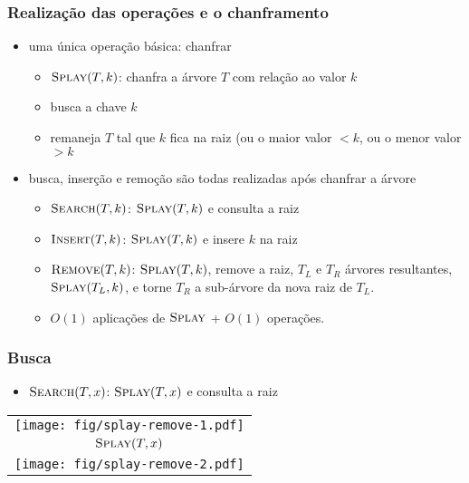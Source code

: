 \documentclass{beamer}
\begin{document}
\begin{frame}
\frametitle{Realização das operações e o chanframento}

\begin{itemize}
\item uma única operação básica: chanfrar
\begin{itemize}
\item $\textnormal{\scshape Splay}(T, k)$: chanfra a árvore $T$ com relação ao valor $k$
\item busca a chave $k$
\item remaneja $T$ tal que $k$ fica na raiz (ou o maior valor $< k$,
ou o menor valor $> k$
\end{itemize}
\item busca, inserção e remoção são todas realizadas após chanfrar a árvore
\begin{itemize}
\item $\textnormal{\scshape Search}(T, k)$: $\textnormal{\scshape Splay}(T, k)$ e consulta a raiz
\item $\textnormal{\scshape Insert}(T, k)$: $\textnormal{\scshape Splay}(T, k)$ e insere $k$ na raiz
\item $\textnormal{\scshape Remove}(T, k)$: $\textnormal{\scshape Splay}(T, k)$, remove a raiz, $T_L$ e $T_R$ árvores resultantes, $\textnormal{\scshape Splay}(T_L, k)$, e torne $T_R$ a sub-árvore da nova raiz de $T_L$.
\item $O(1)$ aplicações de $\textnormal{\scshape Splay}$ + $O(1)$ operações.
\end{itemize}
\end{itemize}
\end{frame}

\begin{frame}
\frametitle{Busca}

\begin{itemize}
\item $\textnormal{\scshape Search}(T, x)$: $\textnormal{\scshape Splay}(T, x)$ e consulta a raiz
\end{itemize}

\begin{tabular}{c}
\texttt{[image: fig/splay-remove-1.pdf]} \pause \\
$\textnormal{\scshape Splay}(T, x)$ \pause \\
\texttt{[image: fig/splay-remove-2.pdf]}
\end{tabular}

\end{frame}
\end{document}
